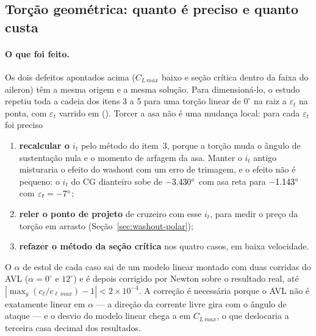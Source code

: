 \subsection{Torção geométrica: quanto é preciso e quanto custa}
\label{sec:washout}

\paragraph{O que foi feito.}
Os dois defeitos apontados acima ($C_{L\,max}$ baixo e seção crítica dentro
da faixa do aileron) têm a mesma origem e a mesma solução. Para dimensioná-lo,
o estudo repetiu toda a cadeia dos itens 3 a 5 para uma torção linear de
$0^\circ$ na raiz a $\varepsilon_t$ na ponta, com $\varepsilon_t$ varrido em
\woLista{} (). Torcer a asa não é uma mudança local: para
cada $\varepsilon_t$ foi preciso

\begin{enumerate}
  \item \textbf{recalcular o $i_t$} pelo método do item~3, porque a torção muda
  o ângulo de sustentação nula e o momento de arfagem da asa. Manter o $i_t$
  antigo misturaria o efeito do washout com um erro de trimagem, e o efeito não
  é pequeno: o $i_t$ do CG dianteiro sobe de $-3.430^\circ$ com asa reta
  para $-1.143^\circ$ com $\varepsilon_t = -7^\circ$;
  \item \textbf{reler o ponto de projeto} de cruzeiro com esse $i_t$, para
  medir o preço da torção em arrasto (Seção~\ref{sec:washout-polar});
  \item \textbf{refazer o método da seção crítica} nos quatro casos, em baixa
  velocidade.
\end{enumerate}

O $\alpha$ de estol de cada caso sai de um modelo linear montado com duas
corridas do AVL ($\alpha = 0^\circ$ e $12^\circ$) e é depois corrigido por
Newton sobre o resultado real, até $|\max_y(c_\ell/c_{\ell\,max}) - 1| <
2\times10^{-4}$. A correção é necessária porque o AVL não é exatamente linear
em $\alpha$ --- a direção da corrente livre gira com o ângulo de ataque --- e o
desvio do modelo linear chega a \woErroLin{} em $C_{L\,max}$, o que deslocaria
a terceira casa decimal dos resultados.

